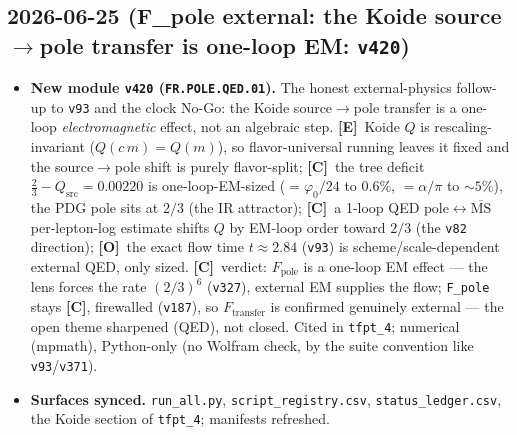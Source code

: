 \documentclass[11pt]{article}
\providecommand{\mE}{\textbf{[E]}}\providecommand{\mC}{\textbf{[C]}}
\providecommand{\mO}{\textbf{[O]}}\providecommand{\mX}{\textbf{[X]}}
\providecommand{\vref}[1]{\texttt{#1}}
\begin{document}
\subsection*{2026-06-25 (F\_pole external: the Koide source$\to$pole transfer is one-loop EM: \texttt{v420})}
\begin{itemize}
\item \textbf{New module \texttt{v420} (\texttt{FR.POLE.QED.01}).} The honest external-physics follow-up to
\vref{v93} and the clock No-Go: the Koide source$\to$pole transfer is a one-loop \emph{electromagnetic}
effect, not an algebraic step. \mE\ Koide $Q$ is rescaling-invariant ($Q(c\,m)=Q(m)$), so flavor-universal
running leaves it fixed and the source$\to$pole shift is purely flavor-split; \mC\ the tree deficit
$\tfrac23-Q_{\mathrm{src}}=0.00220$ is one-loop-EM-sized ($=\varphi_0/24$ to $0.6\%$, $=\alpha/\pi$ to
${\sim}5\%$), the PDG pole sits at $2/3$ (the IR attractor); \mC\ a 1-loop QED
$\mathrm{pole}\!\leftrightarrow\!\overline{\mathrm{MS}}$ per-lepton-log estimate shifts $Q$ by EM-loop order
toward $2/3$ (the \vref{v82} direction); \mO\ the exact flow time $t\approx2.84$ (\vref{v93}) is
scheme/scale-dependent external QED, only sized. \mC\ verdict: $F_{\mathrm{pole}}$ is a one-loop EM effect
--- the lens forces the rate $(2/3)^6$ (\vref{v327}), external EM supplies the flow; \texttt{F\_pole} stays
\mC, firewalled (\vref{v187}), so $F_{\mathrm{transfer}}$ is confirmed genuinely external --- the open theme
sharpened (QED), not closed. Cited in \texttt{tfpt\_4}; numerical (mpmath), Python-only (no Wolfram check,
by the suite convention like \vref{v93}/\vref{v371}).
\item \textbf{Surfaces synced.} \texttt{run\_all.py}, \texttt{script\_registry.csv},
\texttt{status\_ledger.csv}, the Koide section of \texttt{tfpt\_4}; manifests refreshed.
\end{itemize}
\end{document}
